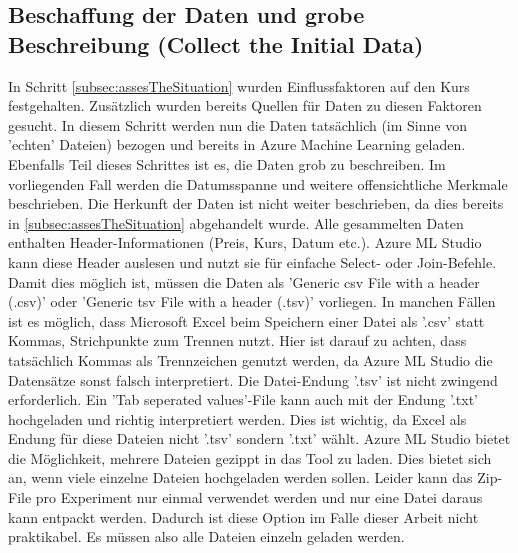 \subsection{Beschaffung der Daten und grobe Beschreibung (Collect the Initial Data)} \label{subsec:collection}
In Schritt \ref{subsec:assesTheSituation} wurden Einflussfaktoren auf den Kurs festgehalten. Zusätzlich wurden bereits Quellen für Daten zu diesen Faktoren gesucht. In diesem Schritt werden nun die Daten tatsächlich (im Sinne von 'echten' Dateien) bezogen und bereits in Azure Machine Learning geladen. Ebenfalls Teil dieses Schrittes ist es, die Daten grob zu beschreiben. Im vorliegenden Fall werden die Datumsspanne und weitere offensichtliche Merkmale beschrieben. Die Herkunft der Daten ist nicht weiter beschrieben, da dies bereits in \ref{subsec:assesTheSituation} abgehandelt wurde.\newline
Alle gesammelten Daten enthalten Header-Informationen (Preis, Kurs, Datum etc.). Azure ML Studio kann diese Header auslesen und nutzt sie für einfache Select- oder Join-Befehle. Damit dies möglich ist, müssen die Daten als 'Generic \gls{csv} File with a header (.csv)' oder 'Generic \gls{tsv} File with a header (.tsv)' vorliegen. In manchen Fällen ist es möglich, dass Microsoft Excel beim Speichern einer Datei als '.csv' statt Kommas, Strichpunkte zum Trennen nutzt. Hier ist darauf zu achten, dass tatsächlich Kommas als Trennzeichen genutzt werden, da Azure ML Studio die Datensätze sonst falsch interpretiert. Die Datei-Endung '.tsv' ist nicht zwingend erforderlich. Ein 'Tab seperated values'-File kann auch mit der Endung '.txt' hochgeladen und richtig interpretiert werden. Dies ist wichtig, da Excel als Endung für diese Dateien nicht '.tsv' sondern '.txt' wählt.\newline
Azure ML Studio bietet die Möglichkeit, mehrere Dateien gezippt in das Tool zu laden. Dies bietet sich an, wenn viele einzelne Dateien hochgeladen werden sollen. Leider kann das Zip-File pro Experiment nur einmal verwendet werden und nur eine Datei daraus kann entpackt werden. Dadurch ist diese Option im Falle dieser Arbeit nicht praktikabel. Es müssen also alle Dateien einzeln geladen werden.

